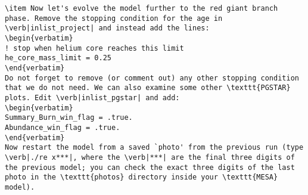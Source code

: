 \documentclass[11pt,a4paper]{article}
\begin{document}
\begin{lstlisting}
\item Now let's evolve the model further to the red giant branch phase. Remove the stopping condition for the age in \verb|inlist_project| and instead add the lines:
\begin{verbatim}
! stop when helium core reaches this limit
he_core_mass_limit = 0.25
\end{verbatim}
Do not forget to remove (or comment out) any other stopping condition that we do not need. We can also examine some other \texttt{PGSTAR} plots. Edit \verb|inlist_pgstar| and add:
\begin{verbatim}
Summary_Burn_win_flag = .true.
Abundance_win_flag = .true.
\end{verbatim}
Now restart the model from a saved `photo' from the previous run (type \verb|./re x***|, where the \verb|***| are the final three digits of the previous model; you can check the exact three digits of the last photo in the \texttt{photos} directory inside your \texttt{MESA} model).


\end{lstlisting}
\end{document}
